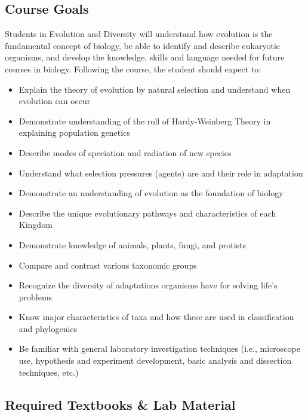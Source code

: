 \documentclass{tufte-handout}
\begin{document}
\begin{fullwidth}

\subsection{Course Goals}

Students in Evolution and Diversity will understand how evolution is the fundamental concept of biology, be able to identify and describe eukaryotic organisms, and develop the knowledge, skills and language needed for future courses in biology. Following the course, the student should expect to:

\begin{itemize}
	\item Explain the theory of evolution by natural selection and understand when evolution can occur
	\item Demonstrate understanding of the roll of Hardy-Weinberg Theory in explaining population genetics
	\item Describe modes of speciation and radiation of new species
	\item Understand what selection pressures (agents) are and their role in adaptation
	\item Demonstrate an understanding of evolution as the foundation of biology
	\item Describe the unique evolutionary pathways and characteristics of each Kingdom
	\item Demonstrate knowledge of animals, plants, fungi, and protists
	\item Compare and contrast various taxonomic groups
	\item Recognize the diversity of adaptations organisms have for solving life's problems
	\item Know major characteristics of taxa and how these are used in classification and phylogenies
	\item Be familiar with general laboratory investigation techniques (i.e., microscope use, hypothesis and experiment development, basic analysis and dissection techniques, etc.)
\end{itemize}

\subsection{Required Textbooks \& Lab Material}


\end{fullwidth}
\end{document}
